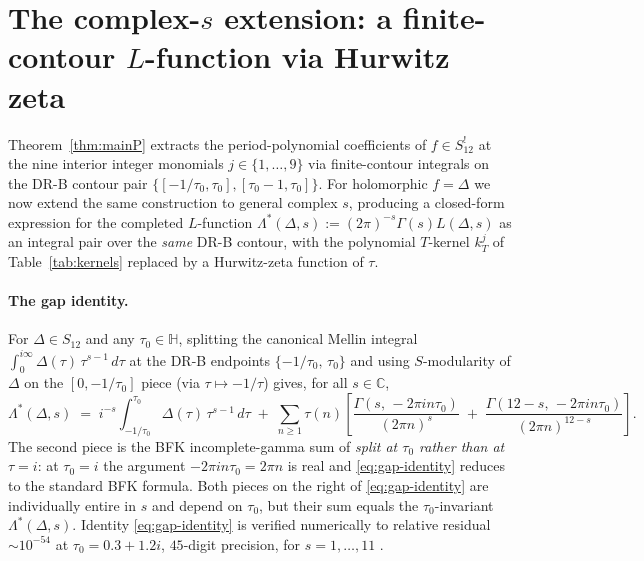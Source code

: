 \documentclass[11pt,letterpaper]{article}
\newcommand{\HH}{\mathbb{H}}
\newcommand{\CC}{\mathbb{C}}
\begin{document}
\section{The complex-\texorpdfstring{$s$}{s} extension: a finite-contour $L$-function via Hurwitz zeta}\label{sec:complex-s}

Theorem~\ref{thm:mainP} extracts the period-polynomial coefficients of $f \in S_{12}^!$ at the nine interior integer monomials $j \in \{1, \ldots, 9\}$ via finite-contour integrals on the DR-B contour pair $\{[-1/\tau_0, \tau_0], [\tau_0 - 1, \tau_0]\}$.  For holomorphic $f = \Delta$ we now extend the same construction to general complex $s$, producing a closed-form expression for the completed $L$-function $\Lambda^*(\Delta, s) := (2\pi)^{-s}\Gamma(s)L(\Delta, s)$ as an integral pair over the \emph{same} DR-B contour, with the polynomial $T$-kernel $k_T^j$ of Table~\ref{tab:kernels} replaced by a Hurwitz-zeta function of $\tau$.

\paragraph{The gap identity.}
For $\Delta \in S_{12}$ and any $\tau_0 \in \HH$, splitting the canonical Mellin integral $\int_0^{i\infty}\!\Delta(\tau)\,\tau^{s-1}\,d\tau$ at the DR-B endpoints $\{-1/\tau_0,\,\tau_0\}$ and using $S$-modularity of $\Delta$ on the $[0, -1/\tau_0]$ piece (via $\tau \mapsto -1/\tau$) gives, for all $s \in \CC$,
\begin{equation}\label{eq:gap-identity}
  \Lambda^*(\Delta, s) \;=\; i^{-s}\!\int_{-1/\tau_0}^{\tau_0}\!\Delta(\tau)\,\tau^{s-1}\,d\tau
  \;+\; \sum_{n \ge 1}\tau(n)\!\left[\frac{\Gamma(s,\,-2\pi i n \tau_0)}{(2\pi n)^s} \;+\; \frac{\Gamma(12-s,\,-2\pi i n \tau_0)}{(2\pi n)^{12-s}}\right].
\end{equation}
The second piece is the BFK incomplete-gamma sum of \cite{BFK2011} \emph{split at $\tau_0$ rather than at $\tau = i$}: at $\tau_0 = i$ the argument $-2\pi i n \tau_0 = 2\pi n$ is real and \eqref{eq:gap-identity} reduces to the standard BFK formula.  Both pieces on the right of \eqref{eq:gap-identity} are individually entire in $s$ and depend on $\tau_0$, but their sum equals the $\tau_0$-invariant $\Lambda^*(\Delta, s)$.  Identity \eqref{eq:gap-identity} is verified numerically to relative residual $\sim 10^{-54}$ at $\tau_0 = 0.3 + 1.2i$, $45$-digit precision, for $s = 1, \ldots, 11$ \cite{ComplexSScript}.
\end{document}
